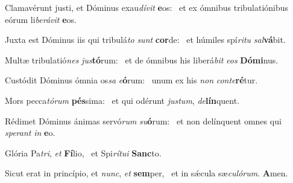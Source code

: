 \item Clamavérunt justi, et Dóminus exau\textit{dívit} \textbf{e}os:~\psstar{} et ex ómnibus tribulatiónibus eórum li\textit{berávit} \textbf{e}os.
\item Juxta est Dóminus iis qui tribulá\textit{to} \textit{sunt} \textbf{cor}de:~\psstar{} et húmiles spí\textit{ritu} \textit{sal}\textbf{vá}bit.
\item Multæ tribulatió\textit{nes} \textit{jus}\textbf{tó}\-rum:~\psstar{} et de ómnibus his liberá\textit{bit} \textit{eos} \textbf{Dó}\textbf{mi}nus.
\item Custódit Dóminus ómnia os\textit{sa} \textit{e}\textbf{ó}rum:~\psstar{} unum ex his \textit{non} \textit{conte}\textbf{ré}tur.
\item Mors pecca\textit{tórum} \textbf{pés}sima:~\psstar{} et qui odérunt \textit{justum}, \textit{de}\textbf{lín}quent.
\item Rédimet Dóminus ánimas servó\textit{rum} \textit{su}\textbf{ó}rum:~\psstar{} et non delínquent omnes qui \textit{sperant} \textit{in} \textbf{e}o.
\item Glória Pa\textit{tri}, \textit{et} \textbf{Fí}lio,~\psstar{} et Spi\textit{rítui} \textbf{Sanc}to.
\item Sicut erat in princípio, et \textit{nunc}, \textit{et} \textbf{sem}per,~\psstar{} et in sǽcula sæ\textit{culórum}. \textbf{A}men.
